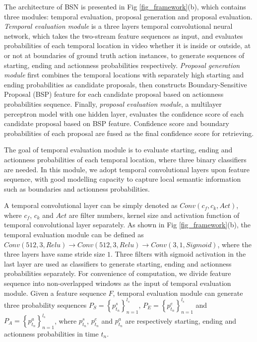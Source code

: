 \documentclass[runningheads]{llncs}
\begin{document}
The architecture of BSN is presented in Fig \ref{fig_framework}(b), which contains three modules: temporal evaluation, proposal generation  and proposal evaluation.
\emph{Temporal evaluation module} is a three layers temporal convolutional neural network, which  takes the two-stream feature sequences as input, and evaluates probabilities of each temporal location in video whether it is inside or outside, at or not at boundaries of ground truth action instances, to generate sequences of starting, ending and actionness probabilities respectively. %
\emph{Proposal generation module} first combines the temporal locations with separately high starting and ending probabilities as candidate proposals, then constructs Boundary-Sensitive Proposal (BSP) feature for each candidate proposal based on  actionness probabilities sequence.
Finally, \emph{proposal evaluation module}, a multilayer perceptron model with one hidden layer, evaluates the confidence score of each candidate proposal based on BSP feature.
Confidence score and boundary probabilities of each proposal are fused as the final confidence score for retrieving.

The goal of temporal evaluation module is to evaluate starting, ending and actionness probabilities of each temporal location, where three binary classifiers are needed. In this module, we adopt temporal convolutional layers upon feature sequence, with good modelling capacity to capture local semantic information such as boundaries and actionness probabilities.

A temporal convolutional layer can be simply  denoted as $Conv(c_f,c_k,Act)$, where $c_f$, $c_k$ and $Act$ are filter numbers, kernel size and activation function of temporal convolutional layer separately. As shown in Fig \ref{fig_framework}(b), the temporal evaluation module can be defined as $Conv(512,3,Relu)\rightarrow Conv(512,3,Relu)\rightarrow Conv(3,1,Sigmoid)$, where the three layers have same stride size $1$.
Three filters with sigmoid activation in the last layer are used as classifiers to generate starting, ending and actionness probabilities separately.
For convenience of computation, we divide feature sequence  into non-overlapped windows as the input of temporal evaluation module.
Given a feature sequence $F$, temporal evaluation module can  generate three probability sequences $P_S=\left \{ p^s_{t_n} \right \}_{n=1}^{l_s}$, $P_E=\left \{ p^e_{t_n} \right \}_{n=1}^{l_s}$ and $P_A=\left \{ p^a_{t_n} \right \}_{n=1}^{l_s}$, where $p^s_{t_n}$, $p^e_{t_n}$ and $p^a_{t_n}$ are respectively starting, ending and actionness probabilities in time $t_n$.
\end{document}
